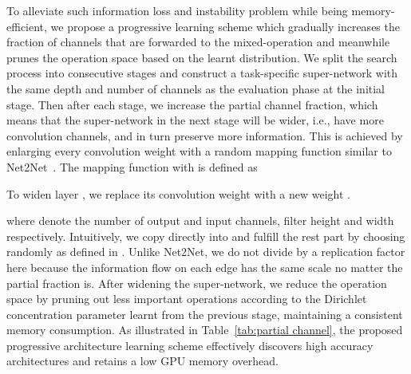\documentclass{article} \usepackage{iclr2021_conference,times}
\begin{document}
To alleviate such information loss and instability problem while being memory-efficient, we propose a progressive learning scheme which gradually increases the fraction of channels that are forwarded to the mixed-operation and meanwhile prunes the operation space based on the learnt distribution.
We split the search process into consecutive stages and construct a task-specific super-network with the same depth and number of channels as the evaluation phase at the initial stage.
Then after each stage, we increase the partial channel fraction, which means that the super-network in the next stage will be wider, i.e., have more convolution channels, and in turn preserve more information.
This is achieved by enlarging every convolution weight with a random mapping function similar to Net2Net~\citep{net2net}. The mapping function  with  is defined as 

To widen layer , we replace its convolution weight  with a new weight .

where  denote the number of output and input channels, filter height and width respectively.
Intuitively, we copy  directly into  and fulfill the rest part by choosing randomly as defined in . 
Unlike Net2Net, we do not divide  by a replication factor here because the information flow on each edge has the same scale no matter the partial fraction is.
After widening the super-network, we reduce the operation space by pruning out less important operations according to the Dirichlet concentration parameter  learnt from the previous stage, maintaining a consistent memory consumption.
As illustrated in Table~\ref{tab:partial channel}, the proposed progressive architecture learning scheme effectively discovers high accuracy architectures and retains a low GPU memory overhead.
\end{document}
